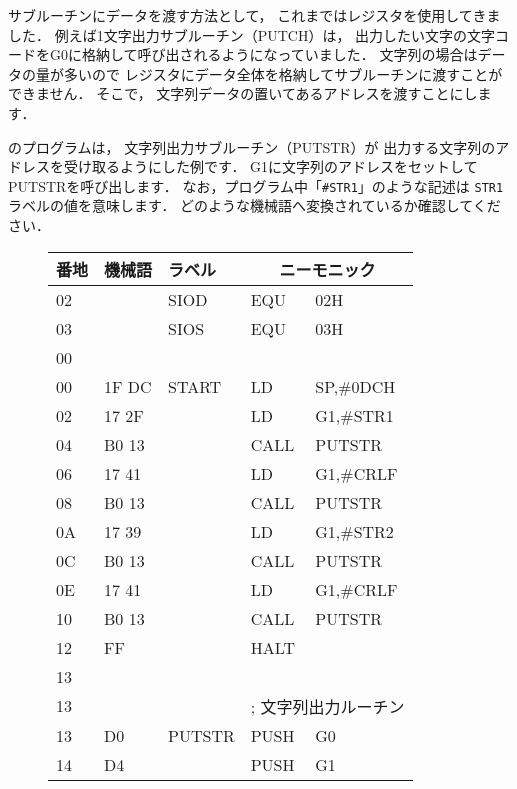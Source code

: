 サブルーチンにデータを渡す方法として，
これまではレジスタを使用してきました．
例えば1文字出力サブルーチン（PUTCH）は，
出力したい文字の文字コードをG0に格納して呼び出されるようになっていました．
文字列の場合はデータの量が多いので
レジスタにデータ全体を格納してサブルーチンに渡すことができません．
そこで，
文字列データの置いてあるアドレスを渡すことにします．

のプログラムは，
文字列出力サブルーチン（PUTSTR）が
出力する文字列のアドレスを受け取るようにした例です．
G1に文字列のアドレスをセットしてPUTSTRを呼び出します．
なお，プログラム中「{\tt \#STR1}」のような記述は
{\tt STR1}ラベルの値を意味します．
どのような機械語へ変換されているか確認してください．

\begin{figure}[btp]
{\small\tt\begin{center}
\begin{tabular}{|l|l|l|l l|} \hline
番地 & 機械語 & ラベル & \multicolumn{2}{|c|}{ニーモニック} \\
\hline
02 &       &  SIOD   & EQU    & 02H             \\
03 &       &  SIOS   & EQU    & 03H             \\
00 &       &         &        &                 \\
00 & 1F DC & START   & LD     & SP,\#0DCH       \\
02 & 17 2F &         & LD     & G1,\#STR1       \\
04 & B0 13 &         & CALL   & PUTSTR          \\
06 & 17 41 &         & LD     & G1,\#CRLF       \\
08 & B0 13 &         & CALL   & PUTSTR          \\
0A & 17 39 &         & LD     & G1,\#STR2       \\
0C & B0 13 &         & CALL   & PUTSTR          \\
0E & 17 41 &         & LD     & G1,\#CRLF       \\
10 & B0 13 &         & CALL   & PUTSTR          \\
12 & FF    &         & HALT   &                 \\
13 &       &         &        &                 \\
13 &       &         & \multicolumn{2}{|l|}{; 文字列出力ルーチン} \\
13 & D0    &  PUTSTR & PUSH   & G0              \\
14 & D4    &         & PUSH   & G1              \\

\end{tabular}
\end{center}}
\end{figure}

